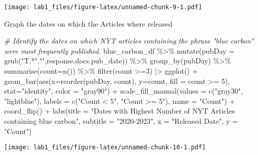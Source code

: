 \documentclass[
]{article}
\newenvironment{Shaded}{\begin{snugshade}}{\end{snugshade}}
\newcommand{\AttributeTok}[1]{\textcolor[rgb]{0.77,0.63,0.00}{#1}}
\newcommand{\CommentTok}[1]{\textcolor[rgb]{0.56,0.35,0.01}{\textit{#1}}}
\newcommand{\DecValTok}[1]{\textcolor[rgb]{0.00,0.00,0.81}{#1}}
\newcommand{\FunctionTok}[1]{\textcolor[rgb]{0.00,0.00,0.00}{#1}}
\newcommand{\NormalTok}[1]{#1}
\newcommand{\SpecialCharTok}[1]{\textcolor[rgb]{0.00,0.00,0.00}{#1}}
\newcommand{\StringTok}[1]{\textcolor[rgb]{0.31,0.60,0.02}{#1}}
\begin{document}
\texttt{[image: lab1\_files/figure-latex/unnamed-chunk-9-1.pdf]}

Graph the dates on which the Articles where released

\begin{Shaded}
\begin{Highlighting}[]
\CommentTok{\# Identify the dates on which NYT articles containing the phrase "blue carbon" were most frequently published.}
\NormalTok{blue\_carbon\_df }\SpecialCharTok{\%\textgreater{}\%}
  \FunctionTok{mutate}\NormalTok{(}\AttributeTok{pubDay =} \FunctionTok{gsub}\NormalTok{(}\StringTok{"T.*"}\NormalTok{,}\StringTok{""}\NormalTok{,response.docs.pub\_date)) }\SpecialCharTok{\%\textgreater{}\%}
  \FunctionTok{group\_by}\NormalTok{(pubDay) }\SpecialCharTok{\%\textgreater{}\%}
  \FunctionTok{summarise}\NormalTok{(}\AttributeTok{count=}\FunctionTok{n}\NormalTok{()) }\SpecialCharTok{\%\textgreater{}\%}
  \FunctionTok{filter}\NormalTok{(count }\SpecialCharTok{\textgreater{}=}\DecValTok{3}\NormalTok{) }\SpecialCharTok{|\textgreater{}} 
  \FunctionTok{ggplot}\NormalTok{() }\SpecialCharTok{+}
  \FunctionTok{geom\_bar}\NormalTok{(}\FunctionTok{aes}\NormalTok{(}\AttributeTok{x=}\FunctionTok{reorder}\NormalTok{(pubDay, count), }\AttributeTok{y=}\NormalTok{count, }\AttributeTok{fill =}\NormalTok{ count }\SpecialCharTok{\textgreater{}=} \DecValTok{5}\NormalTok{), }
           \AttributeTok{stat=}\StringTok{"identity"}\NormalTok{, }\AttributeTok{color =} \StringTok{"gray90"}\NormalTok{) }\SpecialCharTok{+}
  \FunctionTok{scale\_fill\_manual}\NormalTok{(}\AttributeTok{values =} \FunctionTok{c}\NormalTok{(}\StringTok{"gray30"}\NormalTok{, }\StringTok{"lightblue"}\NormalTok{), }
                    \AttributeTok{labels =} \FunctionTok{c}\NormalTok{(}\StringTok{"Count \textless{} 5"}\NormalTok{, }\StringTok{"Count \textgreater{}= 5"}\NormalTok{), }
                    \AttributeTok{name =} \StringTok{"Count"}\NormalTok{) }\SpecialCharTok{+}
  \FunctionTok{coord\_flip}\NormalTok{() }\SpecialCharTok{+}
  \FunctionTok{labs}\NormalTok{(}\AttributeTok{title =} \StringTok{"Dates with Highest Number of NYT Articles containing \textquotesingle{}blue carbon\textquotesingle{}"}\NormalTok{,}
       \AttributeTok{subtitle =} \StringTok{"2020{-}2023"}\NormalTok{,}
       \AttributeTok{x =} \StringTok{"Released Date"}\NormalTok{,}
       \AttributeTok{y =} \StringTok{"Count"}\NormalTok{)}
\end{Highlighting}
\end{Shaded}

\texttt{[image: lab1\_files/figure-latex/unnamed-chunk-10-1.pdf]}
\end{document}
